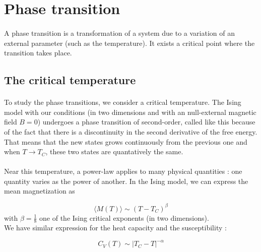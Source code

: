 \documentclass[a4paper, twoside, 11pt]{report}
\theoremstyle{theorem}
\theoremstyle{remark}
\theoremstyle{exemple}
\begin{document}
    \section{Phase transition}
    
        \paragraph{}A phase transition is a transformation of a system due to a variation of an external parameter (such as the temperature). It exists a critical point where the transition takes place. 
    
        \subsection{The critical temperature}
        
            \paragraph{}To study the phase transitions, we consider a critical temperature. The Ising model with our conditions (in two dimensions and with an null-external magnetic field $B=0$) undergoes a phase transition of second-order, called like this because of the fact that there is a discontinuity in the second derivative of the free energy. That means that the new states grows continuously from the previous one and when $T \rightarrow T_C$, these two states are quantatively the same. 
            
            \paragraph{}Near this temperature, a power-law applies to many physical quantities : one quantity varies as the power of another. In the Ising model, we can express the mean magnetization as 
                
                \begin{equation*}
                    \langle M(T)\rangle \sim (T-T_C)^{\beta}
                \end{equation*}
            with $\displaystyle \beta = \frac{1}{8}$ one of the Ising critical exponents (in two dimensions).\\
            We have similar expression for the heat capacity and the susceptibility : 
            
                \begin{equation*}
                    C_V(T) \sim |T_C - T | ^{-\alpha}
                \end{equation*}
                
\end{document}
